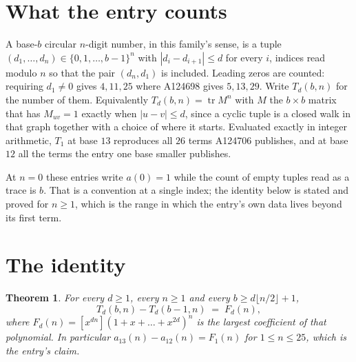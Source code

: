 \documentclass[11pt,a4paper]{article}
\theoremstyle{plain}
\newtheorem{theorem}{Theorem}
\theoremstyle{definition}
\begin{document}
\section{What the entry counts}

A base-$b$ circular $n$-digit number, in this family's sense, is a tuple
$(d_1,\dots,d_n)\in\{0,1,\dots,b-1\}^{n}$ with $|d_i-d_{i+1}|\le d$ for every $i$, indices
read modulo $n$ so that the pair $(d_n,d_1)$ is included. Leading zeros are counted: requiring
$d_1\ne0$ gives $4,11,25$ where A124698 gives $5,13,29$. Write $T_d(b,n)$ for the number of
them. Equivalently $T_d(b,n)=\operatorname{tr}M^{n}$ with $M$ the $b\times b$ matrix that has
$M_{uv}=1$ exactly when $|u-v|\le d$, since a cyclic tuple is a closed walk in that graph
together with a choice of where it starts. Evaluated exactly in integer arithmetic, $T_{1}$
at base $13$ reproduces all $26$ terms A124706 publishes, and at base $12$ all the
terms the entry one base smaller publishes.

At $n=0$ these entries write $a(0)=1$ while the count of empty tuples read as a trace is $b$.
That is a convention at a single index; the identity below is stated and proved for $n\ge1$,
which is the range in which the entry's own data lives beyond its first term.

\section{The identity}

\begin{theorem}
For every $d\ge1$, every $n\ge1$ and every $b\ge d\lfloor n/2\rfloor+1$,
\[
T_d(b,n)-T_d(b-1,n)\;=\;F_d(n),
\]
where $F_d(n)=[x^{dn}](1+x+\dots+x^{2d})^{n}$ is the largest coefficient of that
polynomial. In particular $a_{13}(n)-a_{12}(n)=F_{1}(n)$ for $1\le n\le25$, which
is the entry's claim.
\end{theorem}
\end{document}
